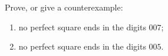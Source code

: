 Prove, or give a counterexample:
\begin{enumerate}
\item[(a)] no perfect square ends in the digits $007$;
\item[(b)] no perfect square ends in the digits $005$.
\end{enumerate}
